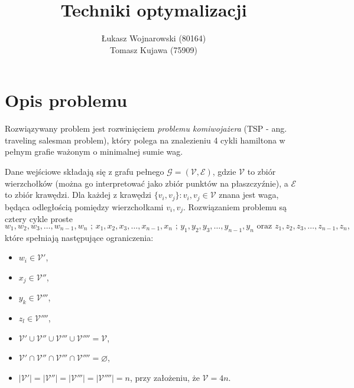 \documentclass{article}
\author{Łukasz Wojnarowski (80164)\\ Tomasz Kujawa (75909)}
\title{Techniki optymalizacji}
\begin{document}
\pagestyle{empty}
\pagestyle{fancy}
\renewcommand{\sectionmark}[1]{\markright{\thesection \quad #1}}
\fancyhf{}
\fancyhead[LE,RO]{\small\bfseries\thepage}
\fancyhead[LO]{\small\bfseries\rightmark}
\renewcommand{\headrulewidth}{0.5pt}
\renewcommand{\footrulewidth}{0pt}
\addtolength{\headheight}{0.5pt}
\fancypagestyle{plain}{
\fancyhead{}
\renewcommand{\headrulewidth}{0pt}
}

\maketitle
\newpage
\tableofcontents %
\newpage

\section{Opis problemu}
Rozwiązywany problem jest rozwinięciem \emph{problemu komiwojażera} (TSP - ang. traveling salesman problem), który polega na znalezieniu 4 cykli hamiltona w pełnym grafie ważonym o minimalnej sumie wag.

Dane wejściowe składają się z grafu pełnego $\mathcal{G}=(\mathcal{V},\mathcal{E})$, gdzie $\mathcal{V}$ to zbiór wierzchołków (można go interpretować jako zbiór punktów na płaszczyźnie), a $\mathcal{E}$ to zbiór krawędzi.
Dla każdej z krawędzi $\{v_i,v_j\} \colon v_i,v_j \in \mathcal{V}$ znana jest waga, będąca odległością pomiędzy wierzchołkami $v_i,v_j$. Rozwiązaniem problemu są cztery cykle proste
\begin{equation}
w_1,w_2,w_3,\ldots,w_{n-1},w_n \mbox{ ; }x_1,x_2,x_3,\ldots,x_{n-1},x_n \mbox{ ; } y_1,y_2,y_3,\ldots,y_{n-1},y_n \mbox{ oraz } z_1,z_2,z_3,\ldots,z_{n-1},z_n,
\end{equation} które spełniają następujące ograniczenia:
\begin{itemize}
	\item $w_i \in \mathcal{V'}$,
	\item $x_j \in \mathcal{V''}$,
	\item $y_k \in \mathcal{V'''}$,
	\item $z_l \in \mathcal{V''''}$,
	\item $\mathcal{V'} \cup \mathcal{V''} \cup \mathcal{V'''} \cup \mathcal{V''''} = \mathcal{V}$,
	\item $\mathcal{V'} \cap \mathcal{V''} \cap \mathcal{V'''} \cap \mathcal{V''''} = \varnothing$,
	\item $|\mathcal{V'}| = |\mathcal{V''}| = |\mathcal{V'''}| = |\mathcal{V''''}| = n$, przy założeniu, że $\mathcal{V} = 4n$.
\end{itemize}
\end{document}
